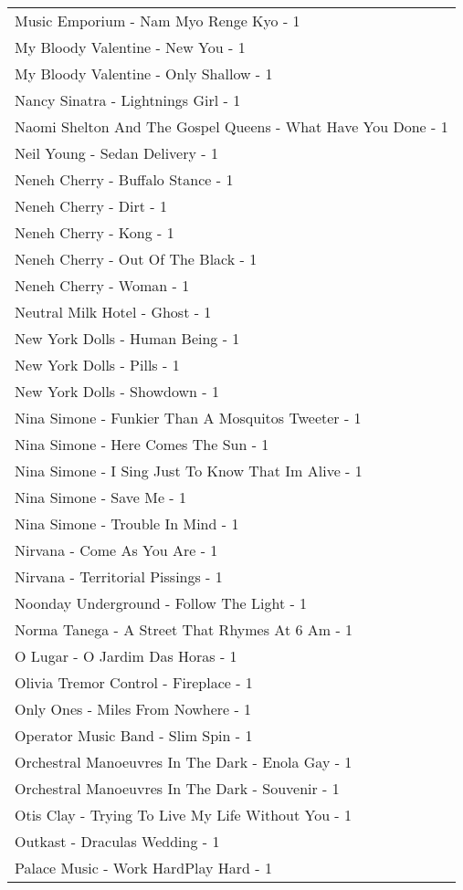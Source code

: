 \documentclass[
]{article}
\begin{document}
\begin{longtable}{l}
Music Emporium - Nam Myo Renge Kyo - 1 \\ 
My Bloody Valentine - New You - 1 \\ 
My Bloody Valentine - Only Shallow - 1 \\ 
Nancy Sinatra - Lightnings Girl - 1 \\ 
Naomi Shelton And The Gospel Queens - What Have You Done - 1 \\ 
Neil Young - Sedan Delivery - 1 \\ 
Neneh Cherry - Buffalo Stance - 1 \\ 
Neneh Cherry - Dirt - 1 \\ 
Neneh Cherry - Kong - 1 \\ 
Neneh Cherry - Out Of The Black - 1 \\ 
Neneh Cherry - Woman - 1 \\ 
Neutral Milk Hotel - Ghost - 1 \\ 
New York Dolls - Human Being - 1 \\ 
New York Dolls - Pills - 1 \\ 
New York Dolls - Showdown - 1 \\ 
Nina Simone - Funkier Than A Mosquitos Tweeter - 1 \\ 
Nina Simone - Here Comes The Sun - 1 \\ 
Nina Simone - I Sing Just To Know That Im Alive - 1 \\ 
Nina Simone - Save Me - 1 \\ 
Nina Simone - Trouble In Mind - 1 \\ 
Nirvana - Come As You Are - 1 \\ 
Nirvana - Territorial Pissings - 1 \\ 
Noonday Underground - Follow The Light - 1 \\ 
Norma Tanega - A Street That Rhymes At 6 Am - 1 \\ 
O Lugar - O Jardim Das Horas - 1 \\ 
Olivia Tremor Control - Fireplace - 1 \\ 
Only Ones - Miles From Nowhere - 1 \\ 
Operator Music Band - Slim Spin - 1 \\ 
Orchestral Manoeuvres In The Dark - Enola Gay - 1 \\ 
Orchestral Manoeuvres In The Dark - Souvenir - 1 \\ 
Otis Clay - Trying To Live My Life Without You - 1 \\ 
Outkast - Draculas Wedding - 1 \\ 
Palace Music - Work HardPlay Hard - 1 \\ 

\end{longtable}
\end{document}
